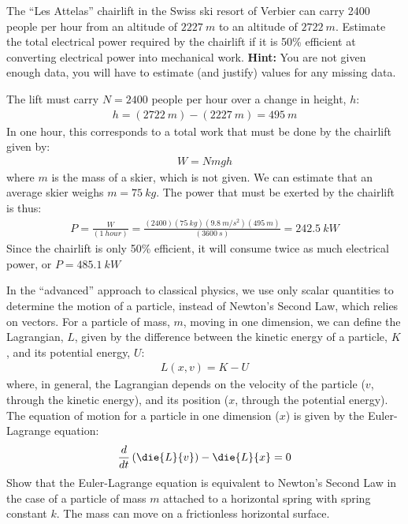 \question The ``Les Attelas'' chairlift in the Swiss ski resort of Verbier can carry \num{2400} people per hour from an altitude of $\SI{2227}{m}$ to an altitude of $\SI{2722}{m}$. Estimate the total electrical power required by the chairlift if it is 50\% efficient at converting electrical power into mechanical work. \textbf{Hint:} You are not given enough data, you will have to estimate (and justify) values for any missing data.
\begin{solution}
The lift must carry $N=\num{2400}$ people per hour over a change in height, $h$:
\begin{align*}
h=(\SI{2722}{m})-(\SI{2227}{m})=\SI{495}{m}
\end{align*}
In one hour, this corresponds to a total work that must be done by the chairlift given by:
\begin{align*}
W=Nmgh
\end{align*}
where $m$ is the mass of a skier, which is not given. We can estimate that an average skier weighs $m=\SI{75}{kg}$. The power that must be exerted by the chairlift is thus:
\begin{align*}
P=\frac{W}{(\SI{1}{hour})}=\frac{(\num{2400})(\SI{75}{kg})(\SI{9.8}{m/s^2})(\SI{495}{m})}{(\SI{3600}{s})}=\SI{242.5}{kW}
\end{align*}
Since the chairlift is only 50\% efficient, it will consume twice as much electrical power, or $P=\SI{485.1}{kW}$
\end{solution}

\question In the ``advanced'' approach to classical physics, we use only scalar quantities to determine the motion of a particle, instead of Newton's Second Law, which relies on vectors. For a particle of mass, $m$, moving in one dimension, we can define the Lagrangian, $L$, given by the difference between the kinetic energy of a particle, $K$, and its potential energy, $U$:
\begin{align*}
L(x,v)=K-U
\end{align*}
where, in general, the Lagrangian depends on the velocity of the particle ($v$, through the kinetic energy), and its position ($x$, through the potential energy). 
The equation of motion for a particle in one dimension ($x$) is given by the Euler-Lagrange equation:
\begin{align*}
\frac{d}{dt}\left(\die{L}{v}\right)-\die{L}{x}=0
\end{align*}
Show that the Euler-Lagrange equation is equivalent to Newton's Second Law in the case of a particle of mass $m$ attached to a horizontal spring with spring constant $k$. The mass can move on a frictionless horizontal surface.

